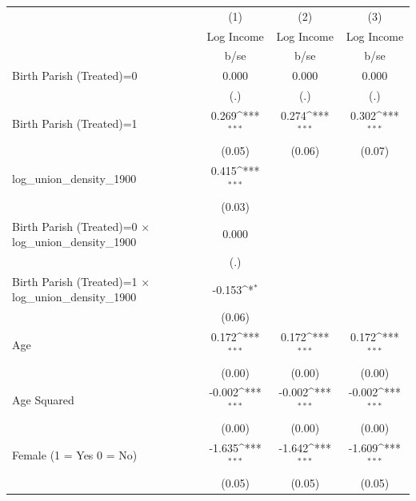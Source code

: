 {
\def\sym#1{\ifmmode^{#1}\else\(^{#1}\)\fi}
\begin{tabular}{l*{3}{c}}
\hline\hline
                    &\multicolumn{1}{c}{(1)}&\multicolumn{1}{c}{(2)}&\multicolumn{1}{c}{(3)}\\
                    &\multicolumn{1}{c}{Log Income}&\multicolumn{1}{c}{Log Income}&\multicolumn{1}{c}{Log Income}\\
                    &        b/se         &        b/se         &        b/se         \\
\hline
Birth Parish (Treated)=0&       0.000         &       0.000         &       0.000         \\
                    &         (.)         &         (.)         &         (.)         \\
Birth Parish (Treated)=1&       0.269\sym{***}&       0.274\sym{***}&       0.302\sym{***}\\
                    &      (0.05)         &      (0.06)         &      (0.07)         \\
log\_union\_density\_1900&       0.415\sym{***}&                     &                     \\
                    &      (0.03)         &                     &                     \\
Birth Parish (Treated)=0 $\times$ log\_union\_density\_1900&       0.000         &                     &                     \\
                    &         (.)         &                     &                     \\
Birth Parish (Treated)=1 $\times$ log\_union\_density\_1900&      -0.153\sym{*}  &                     &                     \\
                    &      (0.06)         &                     &                     \\
Age                 &       0.172\sym{***}&       0.172\sym{***}&       0.172\sym{***}\\
                    &      (0.00)         &      (0.00)         &      (0.00)         \\
Age Squared         &      -0.002\sym{***}&      -0.002\sym{***}&      -0.002\sym{***}\\
                    &      (0.00)         &      (0.00)         &      (0.00)         \\
Female (1 = Yes 0 = No)&      -1.635\sym{***}&      -1.642\sym{***}&      -1.609\sym{***}\\
                    &      (0.05)         &      (0.05)         &      (0.05)         \\

\end{tabular}}
